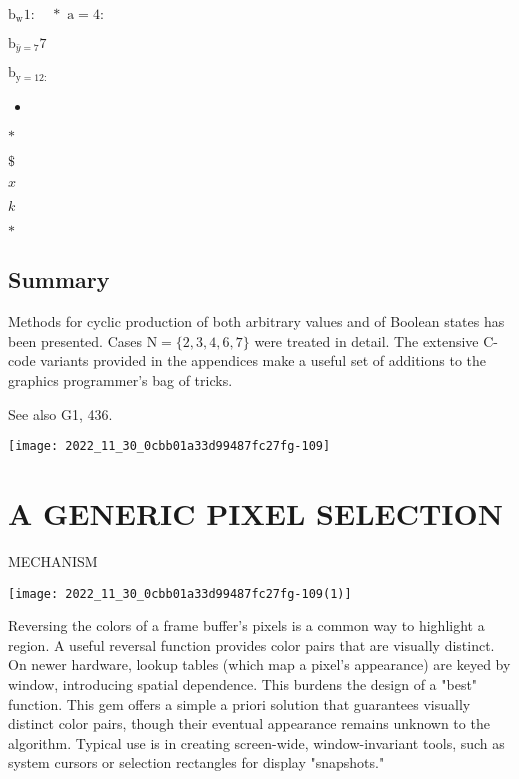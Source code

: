 \begin{CJK}{UTF8}{gbsn}
$\mathrm{b}_{\text {w}} 1: \quad *$
$\mathrm{a}=4:$

$\mathrm{b}_{\bar{y}=7} 7$

$\mathrm{b}_{\mathrm{y}=12:}$

\begin{itemize}
  \item 
\end{itemize}

$*$

$\$$

$x$

$k$

$*$

\subsection*{Summary}
Methods for cyclic production of both arbitrary values and of Boolean states has been presented. Cases $\mathrm{N}=\{2,3,4,6,7\}$ were treated in detail. The extensive C-code variants provided in the appendices make a useful set of additions to the graphics programmer's bag of tricks.

See also G1, 436.

\begin{center}
\texttt{[image: 2022\_11\_30\_0cbb01a33d99487fc27fg-109]}
\end{center}

\section*{A GENERIC PIXEL SELECTION }
 MECHANISM\begin{center}
\texttt{[image: 2022\_11\_30\_0cbb01a33d99487fc27fg-109(1)]}
\end{center}

Reversing the colors of a frame buffer's pixels is a common way to highlight a region. A useful reversal function provides color pairs that are visually distinct. On newer hardware, lookup tables (which map a pixel's appearance) are keyed by window, introducing spatial dependence. This burdens the design of a "best" function. This gem offers a simple a priori solution that guarantees visually distinct color pairs, though their eventual appearance remains unknown to the algorithm. Typical use is in creating screen-wide, window-invariant tools, such as system cursors or selection rectangles for display "snapshots."


\end{CJK}
